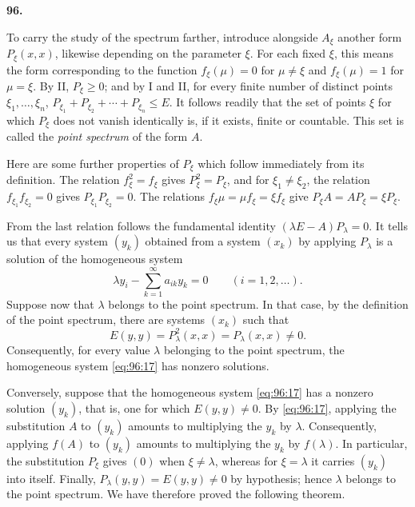 \documentclass[
  paper=b5,
  fontsize=13pt,
  twoside=true,
  open=any,
  bookmarkpackage=false,
  chapterprefix=true,
  headings=normal
]{scrbook}
\theoremstyle{definition}
\newcommand{\numberedparagraph}[1]{%
  \par\medskip\phantomsection\label{sec:#1}%
  \noindent\textbf{#1.}\enspace
}
\begin{document}
\numberedparagraph{96}
To carry the study of the spectrum farther, introduce alongside \(A_\xi\) another
form \(P_\xi(x,x)\), likewise depending on the parameter \(\xi\).  For each
fixed \(\xi\), this means the form corresponding to the function
\(f_\xi(\mu)=0\) for \(\mu\ne\xi\) and \(f_\xi(\mu)=1\) for \(\mu=\xi\).
By II, \(P_\xi\ge0\); and by I and II, for every finite number of distinct points
\(\xi_1,\ldots,\xi_n\),
\(P_{\xi_1}+P_{\xi_2}+\cdots+P_{\xi_n}\le E\).  It follows readily that the set
of points \(\xi\) for which \(P_\xi\) does not vanish identically is, if it
exists, finite or countable.  This set is called the \emph{point spectrum} of
the form \(A\).

Here are some further properties of \(P_\xi\) which follow immediately from its
definition.  The relation \(f_\xi^2=f_\xi\) gives \(P_\xi^2=P_\xi\), and for
\(\xi_1\ne\xi_2\), the relation \(f_{\xi_1}f_{\xi_2}=0\) gives
\(P_{\xi_1}P_{\xi_2}=0\).  The relations
\(f_\xi\mu=\mu f_\xi=\xi f_\xi\) give
\(P_\xi A=AP_\xi=\xi P_\xi\).

From the last relation follows the fundamental identity
\((\lambda E-A)P_\lambda=0\).  It tells us that every system \((y_k)\) obtained
from a system \((x_k)\) by applying \(P_\lambda\) is a solution of the
homogeneous system
\begin{equation}
  \lambda y_i-\sum_{k=1}^{\infty}a_{ik}y_k=0
  \qquad(i=1,2,\ldots).
  \tag{17}\label{eq:96:17}
\end{equation}
Suppose now that \(\lambda\) belongs to the point spectrum.  In that
case, by the definition of the point spectrum, there are systems \((x_k)\)
such that
\[
  E(y,y)=P_\lambda^2(x,x)=P_\lambda(x,x)\ne0.
\]
Consequently, for every value \(\lambda\) belonging to the point spectrum,
the homogeneous system \eqref{eq:96:17} has nonzero solutions.

Conversely, suppose that the homogeneous system \eqref{eq:96:17} has a
nonzero solution \((y_k)\), that is, one for which \(E(y,y)\ne0\).  By
\eqref{eq:96:17}, applying the substitution \(A\) to \((y_k)\) amounts to
multiplying the \(y_k\) by \(\lambda\).  Consequently, applying \(f(A)\) to
\((y_k)\) amounts to multiplying the \(y_k\) by \(f(\lambda)\).  In
particular, the substitution \(P_\xi\) gives \((0)\) when \(\xi\ne\lambda\),
whereas for \(\xi=\lambda\) it carries \((y_k)\) into itself.  Finally,
\(P_\lambda(y,y)=E(y,y)\ne0\) by hypothesis; hence \(\lambda\) belongs to the
point spectrum.  We have therefore proved the following theorem.
\end{document}

